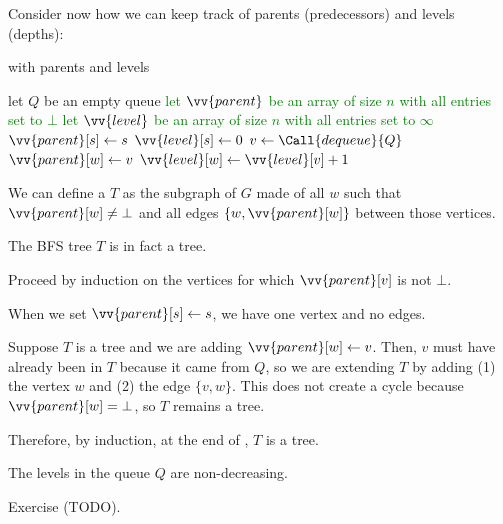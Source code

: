 Consider now how we can keep track of parents (predecessors)
and levels (depths):
\begin{algorithm}[H]
  \caption{ with parents and levels}
  \begin{algorithmic}[1]
    \State let $Q$ be an empty queue
    \State \textcolor{Green}{let $\vv{parent}$ be an array of size $n$ with all entries set to $\bot$}
    \State \textcolor{Green}{let $\vv{level}$ be an array of size $n$ with all entries set to $\infty$}
    \State {}
    \State \textcolor{Green}{$\vv{parent}[s] \gets s$}
    \State \textcolor{Green}{$\vv{level}[s] \gets0$}
      \State $v \gets \Call{dequeue}{Q}$
          \State {}
          \State \textcolor{Green}{$\vv{parent}[w] \gets v$}
          \State \textcolor{Green}{$\vv{level}[w] \gets \vv{level}[v] + 1$}
        \EndIf
      \EndFor
    \EndWhile
  \end{algorithmic}
\end{algorithm}
We can define a  $T$ as the subgraph of $G$
made of all $w$ such that $\vv{parent}[w] \neq \bot$
and all edges $\{w,\vv{parent}[w]\}$ between those vertices.

\begin{claim}
  The BFS tree $T$ is in fact a tree.
\end{claim}
\begin{prf}
  Proceed by induction on the vertices for which $\vv{parent}[v]$ is not $\bot$.

  When we set $\vv{parent}[s] \gets s$, we have one vertex and no edges.

  Suppose $T$ is a tree and we are adding $\vv{parent}[w] \gets v$.
  Then, $v$ must have already been in $T$ because it came from $Q$,
  so we are extending $T$ by adding (1) the vertex $w$ and (2) the edge $\{v,w\}$.
  This does not create a cycle because $\vv{parent}[w] = \bot$,
  so $T$ remains a tree.

  Therefore, by induction, at the end of , $T$ is a tree.
\end{prf}

\begin{claim}\label{claim:bfs:level-non-decreasing}
  The levels in the queue $Q$ are non-decreasing.
\end{claim}
\begin{prf}
  Exercise (TODO).
\end{prf}


